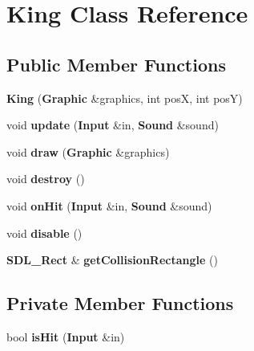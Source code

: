 \section{King Class Reference}
\label{class_king}
\subsection*{Public Member Functions}
\begin{DoxyCompactItemize}
\item 
{\bfseries King} ({\bf Graphic} \&graphics, int pos\+X, int pos\+Y)\label{class_king_ac559c45c410e8e356ac51f55dfec490e}

\item 
void {\bfseries update} ({\bf Input} \&in, {\bf Sound} \&sound)\label{class_king_ae8f4b316eb44ecf9a3f4cef12f20abb4}

\item 
void {\bfseries draw} ({\bf Graphic} \&graphics)\label{class_king_a302fd53f1beb9fd5c7f159ef58675d08}

\item 
void {\bfseries destroy} ()\label{class_king_a29c32eddd07de4c75100c06d969858ab}

\item 
void {\bfseries on\+Hit} ({\bf Input} \&in, {\bf Sound} \&sound)\label{class_king_a2c44b8cbdec8153b88041ee7298dc332}

\item 
void {\bfseries disable} ()\label{class_king_a22278859a9a802b9593bed6509c47808}

\item 
{\bf S\+D\+L\+\_\+\+Rect} \& {\bfseries get\+Collision\+Rectangle} ()\label{class_king_ae356b9770f435e7ddb98cfd3816df51c}

\end{DoxyCompactItemize}
\subsection*{Private Member Functions}
\begin{DoxyCompactItemize}
\item 
bool {\bfseries is\+Hit} ({\bf Input} \&in)\label{class_king_a29f5cafc79707843e6ef910aa2781871}

\end{DoxyCompactItemize}

